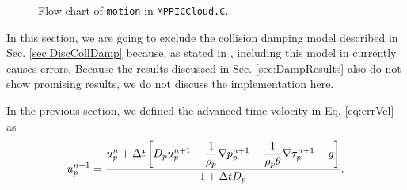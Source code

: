 \begin{figure}[h!]
    \caption{Flow chart of \lstinline|motion| in \lstinline|MPPICCloud.C|.}
    \label{fig:FCMPPIC}
\end{figure}
\FloatBarrier

In this section, we are going to exclude the collision damping model described in Sec. \ref{sec:DiscCollDamp} because, as stated in \cite{chimera}, including this model in \OF currently causes errors.
Because the results discussed in Sec. \ref{sec:DampResults} also do not show promising results, we do not discuss the implementation here.



In the previous section, we defined the advanced time velocity in Eq. \eqref{eq:errVel} as
\begin{equation}
    u_p^{n+1} = \dfrac{u_p^n + \Delta t \left[ D_p u_p^{n+1} - \dfrac{1}{\rho_p} \nabla p_p^{n+1} - \dfrac{1}{\rho_p \theta} \nabla \tau_p^{n+1} - g \right]}{1 + \Delta t D_p} .
\end{equation}


